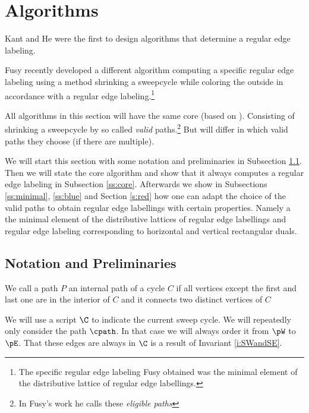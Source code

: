 

\section{Algorithms}
\label{s:algo}
Kant and He \cite{Kant1997} were the first to design algorithms that determine a regular edge labeling.

Fusy \cite{Fusy2006} recently developed a different algorithm computing a specific regular edge labeling using a method shrinking a sweepcycle while coloring the outside in accordance with a regular edge labeling.\footnote{The specific regular edge labeling Fusy obtained was the minimal element of the distributive lattice of regular edge labellings.}

All algorithms in this section will have the same core (based on \cite{Fusy2006}). Consisting of shrinking a sweepcycle by so called \emph{valid} paths.\footnote{In Fusy's work he calls these \emph{eligible paths}} But will differ in which valid paths they choose (if there are multiple).

We will start this section with some notation and preliminaries in Subsection \ref{ss:not}. Then we will state the core algorithm and show that it always computes a regular edge labeling in Subsection \ref{ss:core}. Afterwards we show in Subsections \ref{ss:minimal}, \ref{ss:blue} and Section \ref{s:red} how one can adapt the choice of the valid paths to obtain regular edge labellings with certain properties. Namely a the minimal element of the distributive lattices of regular edge labellings and regular edge labeling corresponding to horizontal and vertical rectangular duals.


\subsection{Notation and Preliminaries}
\label{ss:not}
\begin{defi}
We call a path $P$ an internal path of a cycle $C$ if all vertices except the first and last one are in the interior of $C$ and it connects two distinct vertices of $C$
\end{defi}

We will use a script $\C$ to indicate the current sweep cycle.
We will repeatedly only consider the path $\cpath$. In that case we will always order it from $\pW$ to $\pE$. That these edges are always in $\C$ is a result of Invariant \ref{i:SWandSE}.

